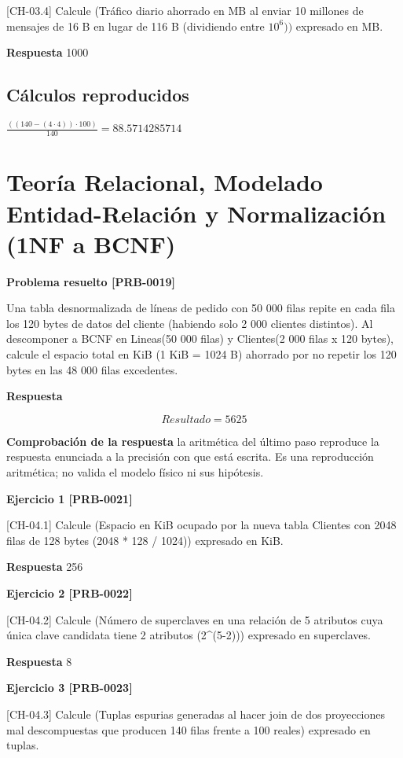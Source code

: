 \documentclass{book}
\begin{document}
[CH-03.4] Calcule (Tráfico diario ahorrado en MB al enviar 10 millones de mensajes de 16 B en lugar de 116 B (dividiendo entre \(10^6))\) expresado en MB.

\noindent\textbf{Respuesta} 1000

\subsection*{Cálculos reproducidos}

\(\frac{\left(\left(140-\left(4\cdot 4\right)\right)\cdot 100\right)}{140} = 88.5714285714\)

\section{Teoría Relacional, Modelado Entidad-Relación y Normalización (1NF a BCNF)}

\noindent\textbf{Problema resuelto [PRB-0019]}

Una tabla desnormalizada de líneas de pedido con 50 000 filas repite en cada fila los 120 bytes de datos del cliente (habiendo solo 2 000 clientes distintos). Al descomponer a BCNF en Lineas(50 000 filas) y Clientes(2 000 filas x 120 bytes), calcule el espacio total en KiB (1 KiB = 1024 B) ahorrado por no repetir los 120 bytes en las 48 000 filas excedentes.

\noindent\textbf{Respuesta}

\[
Resultado = 5625
\]

\noindent\textbf{Comprobación de la respuesta} la aritmética del último paso reproduce la respuesta enunciada a la precisión con que está escrita. Es una reproducción aritmética; no valida el modelo físico ni sus hipótesis.

\noindent\textbf{Ejercicio 1 [PRB-0021]}

[CH-04.1] Calcule (Espacio en KiB ocupado por la nueva tabla Clientes con 2048 filas de 128 bytes (2048 * 128 / 1024)) expresado en KiB.

\noindent\textbf{Respuesta} 256

\noindent\textbf{Ejercicio 2 [PRB-0022]}

[CH-04.2] Calcule (Número de superclaves en una relación de 5 atributos cuya única clave candidata tiene 2 atributos (2\textasciicircum{}(5-2))) expresado en superclaves.

\noindent\textbf{Respuesta} 8

\noindent\textbf{Ejercicio 3 [PRB-0023]}

[CH-04.3] Calcule (Tuplas espurias generadas al hacer join de dos proyecciones mal descompuestas que producen 140 filas frente a 100 reales) expresado en tuplas.
\end{document}
